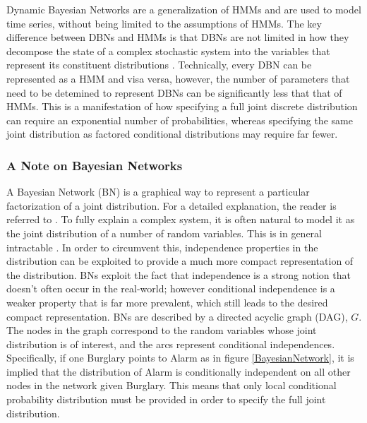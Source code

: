 
\placeholder{}
Dynamic Bayesian Networks are a generalization of HMMs and are used to model time series, without being limited to the assumptions of HMMs. The key difference between DBNs and HMMs is that DBNs are not limited in how they decompose the state of a complex stochastic system into the variables that represent its constituent distributions \cite{AIAMA}. Technically, every DBN can be represented as a HMM and visa versa, however, the number of parameters that need to be detemined to represent DBNs can be significantly less that that of HMMs. This is a manifestation of how specifying a full joint discrete distribution can require an exponential number of probabilities, whereas specifying the same joint distribution as factored conditional distributions may require far fewer.

\subsubsection{A Note on Bayesian Networks}
A Bayesian Network (BN) is a graphical way to represent a particular factorization of a joint distribution. For a detailed explanation, the reader is referred to \cite{KollerPGM}. To fully explain a complex system, it is often natural to model it as the joint distribution of a number of random variables. This is in general intractable \cite{KollerPGM}. In order to circumvent this, independence properties in the distribution can be exploited to provide a much more compact representation of the distribution. BNs exploit the fact that independence is a strong notion that doesn't often occur in the real-world; however conditional independence is a weaker property that is far more prevalent, which still leads to the desired compact representation. BNs are described by a directed acyclic graph (DAG), $G$. The nodes in the graph correspond to the random variables whose joint distribution is of interest, and the arcs represent conditional independences. Specifically, if one Burglary points to Alarm as in figure \ref{BayesianNetwork}, it is implied that the distribution of Alarm is conditionally independent on all other nodes in the network given Burglary. This means that only local conditional probability distribution must be provided in order to specify the full joint distribution.

